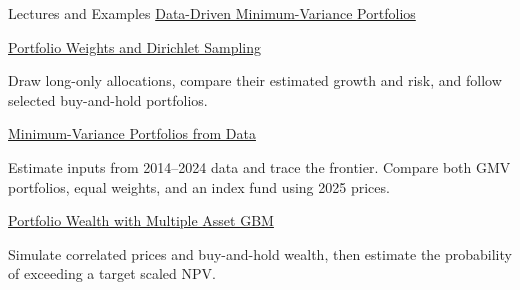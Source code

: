 \documentclass[aspectratio=169,11pt]{beamer}
\begin{document}
\begin{frame}{Lectures and Examples}
  \textbf{}
  \href{https://github.com/varnerlab/CHEME-5660-CourseRepository-Fall-2026/blob/main/lectures/week-6/L6a/CHEME-5660-L6a-Lecture-MAGBM-Data-Portfolios-Fall-2026.ipynb}{Data-Driven Minimum-Variance Portfolios}

  \vspace{0.7em}
  \textbf{}
  \href{https://github.com/varnerlab/CHEME-5660-CourseRepository-Fall-2026/blob/main/lectures/week-6/L6a/CHEME-5660-L6a-Example-Dirichlet-PortfolioWeights-Fall-2026.ipynb}{Portfolio Weights and Dirichlet Sampling}

  Draw long-only allocations, compare their estimated growth and risk, and
  follow selected buy-and-hold portfolios.

  \vspace{0.7em}
  \textbf{}
  \href{https://github.com/varnerlab/CHEME-5660-CourseRepository-Fall-2026/blob/main/lectures/week-6/L6a/CHEME-5660-L6a-Example-Data-MinVar-Portfolio-Fall-2026.ipynb}{Minimum-Variance Portfolios from Data}

  Estimate inputs from 2014--2024 data and trace the frontier. Compare both GMV
  portfolios, equal weights, and an index fund using 2025 prices.

  \vspace{0.7em}
  \textbf{}
  \href{https://github.com/varnerlab/CHEME-5660-CourseRepository-Fall-2026/blob/main/lectures/week-6/L6a/CHEME-5660-L6a-Example-MAGBM-Portfolio-Fall-2026.ipynb}{Portfolio Wealth with Multiple Asset GBM}

  Simulate correlated prices and buy-and-hold wealth, then estimate the
  probability of exceeding a target scaled NPV.
\end{frame}
\end{document}

